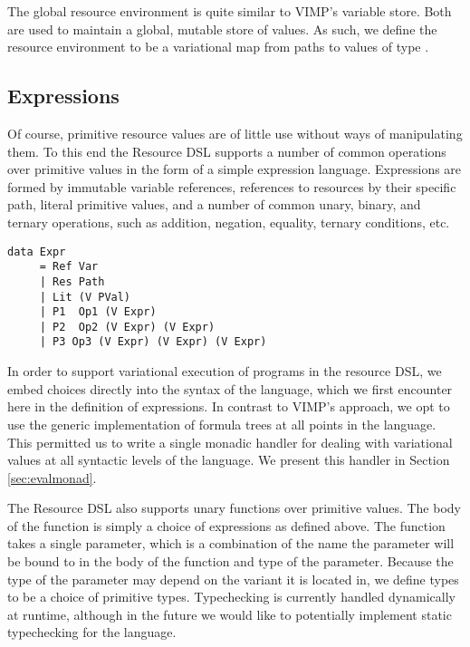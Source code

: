 \documentclass[12pt,oneside]{book}
\begin{document}
The global resource environment is quite similar to VIMP's variable store. Both are used to maintain
a global, mutable store of values. As such, we define the resource environment to be a variational map
from paths to values of type .

\subsection{Expressions}

Of course, primitive resource values are of little use without ways of manipulating them. To this end the Resource DSL supports
a number of common operations over primitive values in the form of a simple expression language. Expressions are formed by
immutable variable references, references to resources by their specific path, literal primitive values, and a number of common unary, binary, and ternary
operations, such as addition, negation, equality, ternary conditions, etc.

\begin{lstlisting}
data Expr
     = Ref Var    
     | Res Path                            
     | Lit (V PVal)           
     | P1  Op1 (V Expr)                    
     | P2  Op2 (V Expr) (V Expr)
     | P3 Op3 (V Expr) (V Expr) (V Expr)
\end{lstlisting}

In order to support variational execution of programs in the resource DSL, we embed choices directly into the syntax of the language, which
we first encounter here in the definition of expressions. In contrast to VIMP's approach, we opt to use the generic implementation of formula
trees at all points in the language. This permitted us to write a single monadic handler for dealing with variational values at all syntactic levels
of the language. We present this handler in Section \ref{sec:evalmonad}.

The Resource DSL also supports unary functions over primitive values. The body of the function is simply a choice of expressions as defined above.
The function takes a single parameter, which is a combination of the name the parameter will be bound to in the body of the function and type of the parameter. Because the
type of the parameter may depend on the variant it is located in, we define types to be a choice of primitive types. Typechecking is currently handled dynamically at runtime,
although in the future we would like to potentially implement static typechecking for the language.
\end{document}
